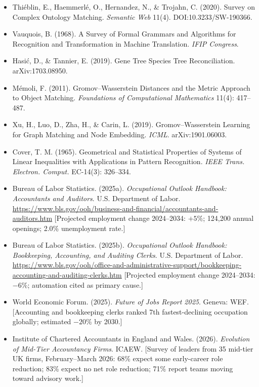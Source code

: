 \documentclass[12pt]{clapps}  %
\begin{document}
\begin{itemize}
    \item Thiéblin, E., Haemmerlé, O., Hernandez, N., \& Trojahn, C. (2020). Survey on Complex Ontology Matching. \textit{Semantic Web} 11(4). DOI:10.3233/SW-190366.
    \item Vauquois, B. (1968). A Survey of Formal Grammars and Algorithms for Recognition and Transformation in Machine Translation. \textit{IFIP Congress}.
    \item Hasić, D., \& Tannier, E. (2019). Gene Tree Species Tree Reconciliation. arXiv:1703.08950.
    \item Mémoli, F. (2011). Gromov--Wasserstein Distances and the Metric Approach to Object Matching. \textit{Foundations of Computational Mathematics} 11(4): 417--487.
    \item Xu, H., Luo, D., Zha, H., \& Carin, L. (2019). Gromov--Wasserstein Learning for Graph Matching and Node Embedding. \textit{ICML}. arXiv:1901.06003.
    \item Cover, T. M. (1965). Geometrical and Statistical Properties of Systems of Linear Inequalities with Applications in Pattern Recognition. \textit{IEEE Trans. Electron. Comput.} EC-14(3): 326--334.
    \item Bureau of Labor Statistics. (2025a). \textit{Occupational Outlook Handbook: Accountants and Auditors}. U.S. Department of Labor. \url{https://www.bls.gov/ooh/business-and-financial/accountants-and-auditors.htm} [Projected employment change 2024--2034: $+5\%$; 124,200 annual openings; 2.0\% unemployment rate.]
    \item Bureau of Labor Statistics. (2025b). \textit{Occupational Outlook Handbook: Bookkeeping, Accounting, and Auditing Clerks}. U.S. Department of Labor. \url{https://www.bls.gov/ooh/office-and-administrative-support/bookkeeping-accounting-and-auditing-clerks.htm} [Projected employment change 2024--2034: $-6\%$; automation cited as primary cause.]
    \item World Economic Forum. (2025). \textit{Future of Jobs Report 2025}. Geneva: WEF. [Accounting and bookkeeping clerks ranked 7th fastest-declining occupation globally; estimated $-20\%$ by 2030.]
    \item Institute of Chartered Accountants in England and Wales. (2026). \textit{Evolution of Mid-Tier Accountancy Firms}. ICAEW. [Survey of leaders from 35 mid-tier UK firms, February--March 2026: 68\% expect some early-career role reduction; 83\% expect no net role reduction; 71\% report teams moving toward advisory work.]

\end{itemize}
\end{document}
